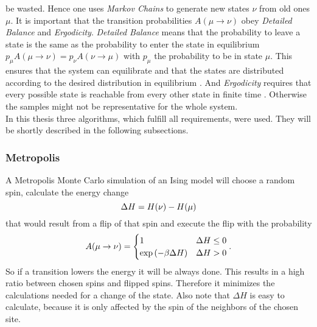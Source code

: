     be wasted.
    Hence one uses \emph{Markov Chains} to generate new states \(\nu\)
    from old ones \(\mu\). It is important that the transition probabilities
    \(A(\mu \to \nu)\) obey \emph{Detailed Balance} and \emph{Ergodicity}.
    \emph{Detailed Balance} means that the probability to leave a state is
    the same as the probability to enter the state in equilibrium
    \(p_\mu A(\mu \to \nu) = p_\nu A(\nu \to \mu)\) with \(p_\mu\) the
    probability to be in state \(\mu\). This ensures that the system can
    equilibrate and that the states are distributed according to the
    desired distribution in equilibrium \cite{NewmanBarkema1999}.
    And \emph{Ergodicity} requires that every possible state is reachable
    from every other state in finite time \cite{NewmanBarkema1999} \cite{Katzgraber2011}.
    Otherwise the samples might not be representative for the whole system.\\
    In this thesis three algorithms, which fulfill all requirements,
    were used. They will be shortly described in the following subsections.

    \subsubsection{Metropolis}
        A Metropolis Monte Carlo \cite{Metropolis1953} simulation of an
        Ising model will choose a random spin, calculate the energy change
        \begin{equation}
            \Delta H = H(\nu) - H(\mu)\\
            \label{eq:dH}
        \end{equation}
        that would result from a flip of that spin and execute the flip
        with the probability \cite{NewmanBarkema1999} \cite{Katzgraber2011}
        \begin{equation}
            A(\mu \to \nu) =
            \begin{cases}
                1                            & \Delta H \le 0 \\
                \exp{\ensuremath{\left(-\beta \Delta H\right)}} & \Delta H > 0
            \end{cases}.
            \label{eq:metropolis}
        \end{equation}
        So if a transition lowers the energy it will be always done. This
        results in a high ratio between chosen spins and flipped spins.
        Therefore it minimizes the calculations needed for a change of
        the state. Also note that \(\Delta H\) is easy to calculate,
        because it is only affected by the spin of the neighbors of the
        chosen site.

